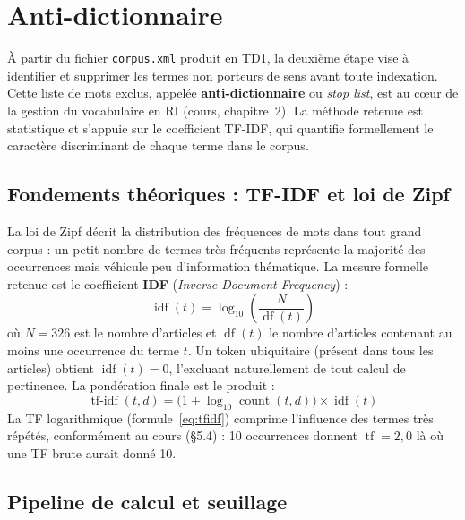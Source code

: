 \chapter{Anti-dictionnaire}
\label{chap:td2}

À partir du fichier \texttt{corpus.xml} produit en TD1, la deuxième étape vise à
identifier et supprimer les termes non porteurs de sens avant toute indexation. Cette
liste de mots exclus, appelée \textbf{anti-dictionnaire} ou \emph{stop list}, est au
cœur de la gestion du vocabulaire en RI (cours, chapitre~2). La méthode retenue est
statistique et s'appuie sur le coefficient TF-IDF, qui quantifie formellement le
caractère discriminant de chaque terme dans le corpus.

\section{Fondements théoriques : TF-IDF et loi de Zipf}

La loi de Zipf décrit la distribution des fréquences de mots dans tout grand corpus :
un petit nombre de termes très fréquents représente la majorité des occurrences mais
véhicule peu d'information thématique. La mesure formelle retenue est le coefficient
\textbf{IDF} (\emph{Inverse Document Frequency}) :
\begin{equation}
  \operatorname{idf}(t) = \log_{10}\!\left(\frac{N}{\operatorname{df}(t)}\right)
  \label{eq:idf}
\end{equation}
où $N = 326$ est le nombre d'articles et $\operatorname{df}(t)$ le nombre d'articles
contenant au moins une occurrence du terme $t$. Un token ubiquitaire (présent dans
tous les articles) obtient $\operatorname{idf}(t)=0$, l'excluant naturellement de tout
calcul de pertinence. La pondération finale est le produit :
\begin{equation}
  \operatorname{tf\text{-}idf}(t,d)
    = \bigl(1 + \log_{10} \operatorname{count}(t,d)\bigr)
      \times \operatorname{idf}(t)
  \label{eq:tfidf}
\end{equation}
La TF logarithmique (formule~\ref{eq:tfidf}) comprime l'influence des termes très
répétés, conformément au cours (§5.4) : 10 occurrences donnent $\operatorname{tf}=2{,}0$
là où une TF brute aurait donné 10.

\section{Pipeline de calcul et seuillage}

